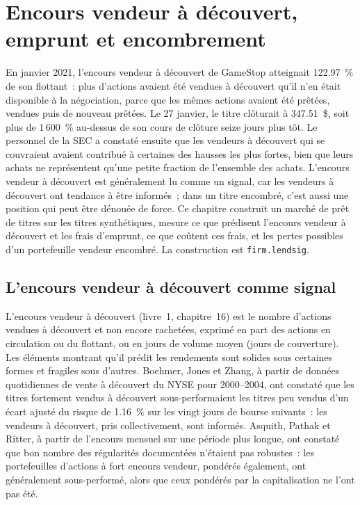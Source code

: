 \chapter{Encours vendeur à découvert, emprunt et encombrement}\label{ch:s1:short-interest-borrow-and-crowding}

En janvier 2021, l'encours vendeur à découvert de GameStop atteignait 122.97~\% de son flottant~: plus d'actions avaient été vendues à découvert qu'il n'en était disponible à la négociation, parce que les
mêmes actions avaient été prêtées, vendues puis de nouveau prêtées. Le 27 janvier, le titre clôturait à 347.51~\$, soit plus de 1\,600~\% au-dessus de son cours de clôture seize jours plus tôt. Le personnel de la SEC
a constaté ensuite que les vendeurs à découvert qui se couvraient avaient contribué à certaines des hausses les plus fortes, bien que leurs achats ne représentent qu'une petite fraction de
l'ensemble des achats. L'encours vendeur à découvert est généralement lu comme un signal, car les vendeurs à découvert ont tendance à être informés~; dans un titre encombré, c'est aussi une position qui peut être
dénouée de force. Ce chapitre construit un marché de prêt de titres sur les titres synthétiques, mesure ce que prédisent l'encours vendeur à découvert et les frais d'emprunt, ce que coûtent ces frais, et les pertes possibles
d'un portefeuille vendeur encombré. La construction est \texttt{firm.lendsig}.

\section{L'encours vendeur à découvert comme signal}

L'encours vendeur à découvert (livre~1, chapitre~16) est le nombre d'actions vendues à découvert et non encore rachetées, exprimé en part des actions en circulation ou du flottant,
ou en jours de volume moyen (jours de couverture). Les éléments montrant qu'il prédit les rendements sont solides sous certaines formes et fragiles sous d'autres. Boehmer, Jones et Zhang,
à partir de données quotidiennes de vente à découvert du NYSE pour 2000--2004, ont constaté que les titres fortement vendus à découvert sous-performaient les titres peu vendus d'un écart ajusté du risque de 1.16~\% sur les
vingt jours de bourse suivants~: les vendeurs à découvert, pris collectivement, sont informés. Asquith, Pathak et Ritter, à partir de l'encours mensuel sur une période plus longue, ont constaté que bon nombre des
régularités documentées n'étaient pas robustes~: les portefeuilles d'actions à fort encours vendeur, pondérés également, ont généralement sous-performé, alors que ceux pondérés par la capitalisation ne l'ont pas été.

